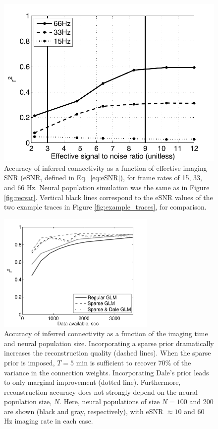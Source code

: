 \documentclass[aoas,preprint]{imsart}
\begin{document}
\begin{figure}[t!]
\centering
\begin{minipage}[c]{0.6\hsize}
\includegraphics[width=\hsize]{../figs/FigureA6_recvar_SNRc}
\end{minipage}
\caption{Accuracy of inferred connectivity as a function of effective
imaging SNR (eSNR, defined in Eq.~\ref{eq:eSNR}), for frame rates of
15, 33, and 66 Hz.  Neural population simulation was the same as in
Figure \ref{fig:recvar}.  Vertical black lines correspond to the eSNR
values of the two example traces in Figure \ref{fig:example_traces},
for comparison.}
\label{fig:recvar-SNR}
\end{figure}


\begin{figure}[t!]
\centering
\includegraphics[width=3in]{../figs/FigureA7_recvar_NT}
\caption{Accuracy of inferred connectivity as a function of the
imaging time and neural population size. Incorporating a sparse prior
dramatically increases the reconstruction quality (dashed lines). When
the sparse prior is imposed, $T=5$ min is sufficient to recover $70\%$
of the variance in the connection weights. Incorporating Dale's prior
leads to only marginal improvement (dotted line). Furthermore,
reconstruction accuracy does not strongly depend on the neural
population size, $N$. Here, neural populations of size $N=100$ and
$200$ are shown (black and gray, respectively), with eSNR $\approx 10$
and $60$ Hz imaging rate in each case.}
\label{fig:recvar-NT}
\end{figure}
\end{document}
